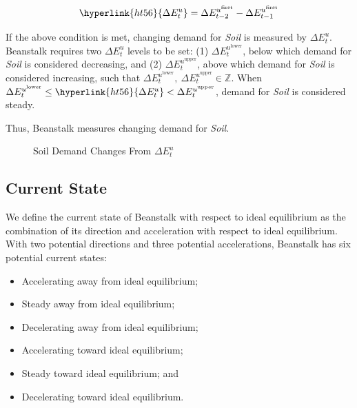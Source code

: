 \documentclass[tikz]{article}
\newcommand{\term}[1]{\textsl{#1}}
\begin{document}
    $$
        \hyperlink{ht56}{\Delta E_{t}^{u}} = 
            \Delta E_{t-2}^{u^{\text{first}}} - \Delta E_{t-1}^{u^{\text{first}}}
    $$

If the above condition is met, changing demand for \term{Soil} is measured by \hyperlink{ht56}{$\Delta E_{t}^{u}$}. Beanstalk requires two \hyperlink{ht56}{$\Delta E_{t}^{u}$} levels to be set: (1) $\Delta E_{t}^{u^{\text{lower}}}$, below which demand for \term{Soil} is considered decreasing, and (2) $\Delta E_{t}^{u^{\text{upper}}}$, above which demand for \term{Soil} is considered increasing, such that $\Delta E_{t}^{u^{\text{lower}}},\ \Delta E_{t}^{u^{\text{upper}}} \in \mathbb{Z}$. When $\Delta E_{t}^{u^{\text{lower}}} \leq \hyperlink{ht56}{\Delta E_{t}^{u}} < \Delta E_{t}^{u^{\text{upper}}}$, demand for \term{Soil} is considered steady.

Thus, Beanstalk measures changing demand for \term{Soil}.

\begin{figure}[h!]
    \centering
    
    \vspace*{-10.5mm} %
    \setlength{\belowcaptionskip}{-8pt} %
    \caption{Soil Demand Changes From $\Delta E_{t}^{u}$}
    \label{Fig 9}
\end{figure}


\subsection{Current State}

We define the current state of Beanstalk with respect to ideal equilibrium as the combination of its direction and acceleration with respect to ideal equilibrium. With two potential directions and three potential accelerations, Beanstalk has six potential current states:

\begin{multicols}{2}
\begin{itemize}[midsep]
    \item Accelerating away from ideal equilibrium;
    \item Steady away from ideal equilibrium;
    \item Decelerating away from ideal equilibrium;
    \item Accelerating toward ideal equilibrium;
    \item Steady toward ideal equilibrium; and
    \item Decelerating toward ideal equilibrium.
\end{itemize}
\end{multicols}
\end{document}
